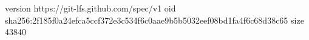 version https://git-lfs.github.com/spec/v1
oid sha256:2f185f0a24efca5ccf372e3c534f6c0aae9b5b5032eef08bd1fa4f6c68d38c65
size 43840
